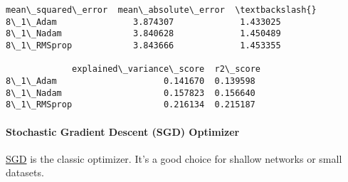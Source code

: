 \documentclass[11pt]{article}
\makeatletter
\newcommand{\boxspacing}{\kern\kvtcb@left@rule\kern\kvtcb@boxsep}
\newcommand{\prompt}[4]{
        {\ttfamily\llap{{\color{#2}[#3]:\hspace{3pt}#4}}\vspace{-\baselineskip}}
    }
\makeatother
\begin{document}
            \begin{tcolorbox}[breakable, size=fbox, boxrule=.5pt, pad at break*=1mm, opacityfill=0]
\prompt{Out}{outcolor}{59}{\boxspacing}
\begin{Verbatim}[commandchars=\\\{\}]
             mean\_squared\_error  mean\_absolute\_error  \textbackslash{}
8\_1\_Adam               3.874307             1.433025
8\_1\_Nadam              3.840628             1.450489
8\_1\_RMSprop            3.843666             1.453355

             explained\_variance\_score  r2\_score
8\_1\_Adam                     0.141670  0.139598
8\_1\_Nadam                    0.157823  0.156640
8\_1\_RMSprop                  0.216134  0.215187
\end{Verbatim}
\end{tcolorbox}
        
    \paragraph{Stochastic Gradient Descent (SGD)
Optimizer}\label{stochastic-gradient-descent-sgd-optimizer}

\href{https://keras.io/api/optimizers/sgd/}{SGD} is the classic
optimizer. It's a good choice for shallow networks or small datasets.
\end{document}
